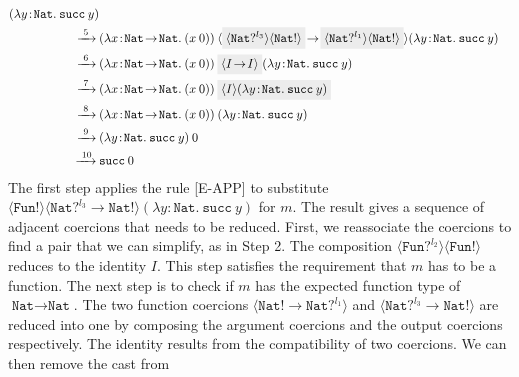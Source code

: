 \begin{align*}
    (\lambda y \! : \! \texttt{Nat} . \: \texttt{succ} \: y) \\
    \xrightarrow{\text{ 5 }} \:
    & (\lambda x \! : \! \texttt{Nat} \! \rightarrow \! \texttt{Nat} . \: 
    (x \: 0)) \: \langle \highlight{\langle \texttt{Nat}? ^{l_3} \rangle \langle \texttt{Nat}! \rangle} \! \rightarrow \! 
    \highlight{\langle \texttt{Nat}? ^{l_1} \rangle \langle \texttt{Nat}! \rangle} \rangle
    (\lambda y \! : \! \texttt{Nat} . \: \texttt{succ} \: y) \\
    \xrightarrow{\text{ 6 }} \:
    & (\lambda x \! : \! \texttt{Nat} \! \rightarrow \! \texttt{Nat} . \: 
    (x \: 0)) \: \highlight{\langle I \! \rightarrow \! I \rangle}
    (\lambda y \! : \! \texttt{Nat} . \: \texttt{succ} \: y) \\
    \xrightarrow{\text{ 7 }} \:
    & (\lambda x \! : \! \texttt{Nat} \! \rightarrow \! \texttt{Nat} . \: 
    (x \: 0)) \: \highlight{\langle I \rangle
    (\lambda y \! : \! \texttt{Nat} . \: \texttt{succ} \: y)} \\
    \xrightarrow{\text{ 8 }} \:
    & (\lambda x \! : \! \texttt{Nat} \! \rightarrow \! \texttt{Nat} . \: 
    (x \: 0)) \: 
    (\lambda y \! : \! \texttt{Nat} . \: \texttt{succ} \: y) \\
    \xrightarrow{\text{ 9 }} \:
    & (\lambda y \! : \! \texttt{Nat} . \: \texttt{succ} \: y) \: 0 \\
    \xrightarrow{\text{ 10}} \:
    & \texttt{succ} \: 0
\end{align*}
The first step applies the rule {\scriptsize{[E-APP]}} to substitute 
$\langle \texttt{Fun}! \rangle \langle \texttt{Nat}? ^{l_3} \! \rightarrow \! \texttt{Nat}! \rangle 
(\lambda y \! : \! \texttt{Nat} . \: \texttt{succ} \: y)$ for $m$. The result gives 
a sequence of adjacent coercions that needs to be reduced. First, we reassociate the coercions 
to find a pair that we can simplify, as in Step 2. The composition $\langle \texttt{Fun}? ^{l_2} \rangle 
\langle \texttt{Fun}! \rangle$ reduces to the identity $I$. This step satisfies the requirement that 
$m$ has to be a function. The next step is to check if $m$ has the expected function type of 
$\texttt{Nat} \! \rightarrow \! \texttt{Nat}$. The two function coercions $\langle \texttt{Nat}! \! 
\rightarrow \! \texttt{Nat}? ^{l_1} \rangle$ and $\langle \texttt{Nat}? ^{l_3} \! \rightarrow \! \texttt{Nat}! \rangle$ 
are reduced into one by composing the argument coercions and the output coercions respectively. The 
identity results from the compatibility of two coercions. We can then remove the cast from  
